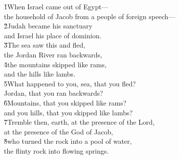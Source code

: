\begin{poetry}
\poeml \v{1}When Israel came out of Egypt--- \\
\poemll    the household of Jacob from a people of foreign speech--- \\
\poeml \v{2}Judah became his sanctuary \\
\poemll    and Israel his place of dominion. \\
\poeml \v{3}The sea saw this and fled, \\
\poemll    the Jordan River ran backwards, \\
\poeml \v{4}the mountains skipped like rams, \\
\poemll    and the hills like lambs. \\
\poeml \v{5}What happened to you, sea, that you fled? \\
\poemll    Jordan, that you ran backwards? \\
\poeml \v{6}Mountains, that you skipped like rams? \\
\poemll    and you hills, that you skipped like lambs? \\
\poeml \v{7}Tremble then, earth, at the presence of the Lord, \\
\poemll    at the presence of the God of Jacob, \\
\poeml \v{8}who turned the rock into a pool of water, \\
\poemll    the flinty rock into flowing springs.
\end{poetry}

